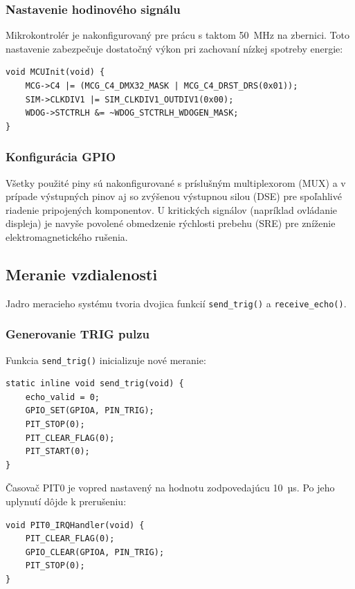 \documentclass[11pt, a4paper,slovak]{article}
\begin{document}
\subsubsection{Nastavenie hodinového signálu}

Mikrokontrolér je nakonfigurovaný pre prácu s taktom 50~MHz na zbernici. Toto nastavenie zabezpečuje dostatočný výkon pri zachovaní nízkej spotreby energie:

\begin{lstlisting}
void MCUInit(void) {
    MCG->C4 |= (MCG_C4_DMX32_MASK | MCG_C4_DRST_DRS(0x01));
    SIM->CLKDIV1 |= SIM_CLKDIV1_OUTDIV1(0x00);
    WDOG->STCTRLH &= ~WDOG_STCTRLH_WDOGEN_MASK;
}
\end{lstlisting}

\subsubsection{Konfigurácia GPIO}

Všetky použité piny sú nakonfigurované s príslušným multiplexorom (MUX) a v prípade výstupných pinov aj so zvýšenou výstupnou silou (DSE) pre spoľahlivé riadenie pripojených komponentov. U kritických signálov (napríklad ovládanie displeja) je navyše povolené obmedzenie rýchlosti prebehu (SRE) pre zníženie elektromagnetického rušenia.

\subsection{Meranie vzdialenosti}

Jadro meracieho systému tvoria dvojica funkcií \texttt{send\_trig()} a \texttt{receive\_echo()}.

\subsubsection{Generovanie TRIG pulzu}

Funkcia \texttt{send\_trig()} inicializuje nové meranie:

\begin{lstlisting}
static inline void send_trig(void) {
    echo_valid = 0;
    GPIO_SET(GPIOA, PIN_TRIG);
    PIT_STOP(0);
    PIT_CLEAR_FLAG(0);
    PIT_START(0);
}
\end{lstlisting}
Časovač PIT0 je vopred nastavený na hodnotu zodpovedajúcu 10~µs. Po jeho uplynutí dôjde k prerušeniu:

\begin{lstlisting}
void PIT0_IRQHandler(void) {
    PIT_CLEAR_FLAG(0);
    GPIO_CLEAR(GPIOA, PIN_TRIG);
    PIT_STOP(0);
}
\end{lstlisting}
\end{document}

